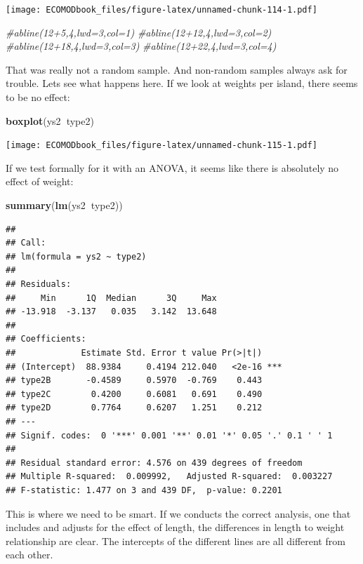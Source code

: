 \documentclass[
]{book}
\newenvironment{Shaded}{\begin{snugshade}}{\end{snugshade}}
\newcommand{\CommentTok}[1]{\textcolor[rgb]{0.56,0.35,0.01}{\textit{#1}}}
\newcommand{\KeywordTok}[1]{\textcolor[rgb]{0.13,0.29,0.53}{\textbf{#1}}}
\newcommand{\NormalTok}[1]{#1}
\newcommand{\OperatorTok}[1]{\textcolor[rgb]{0.81,0.36,0.00}{\textbf{#1}}}
\begin{document}
\texttt{[image: ECOMODbook\_files/figure-latex/unnamed-chunk-114-1.pdf]}

\begin{Shaded}
\begin{Highlighting}[]
\CommentTok{#abline(12+5,4,lwd=3,col=1)}
\CommentTok{#abline(12+12,4,lwd=3,col=2)}
\CommentTok{#abline(12+18,4,lwd=3,col=3)}
\CommentTok{#abline(12+22,4,lwd=3,col=4)}
\end{Highlighting}
\end{Shaded}

That was really not a random sample. And non-random samples always ask for trouble. Lets see what happens here. If we look at weights per island, there seems to be no effect:

\begin{Shaded}
\begin{Highlighting}[]
\KeywordTok{boxplot}\NormalTok{(ys2}\OperatorTok{~}\NormalTok{type2)}
\end{Highlighting}
\end{Shaded}

\texttt{[image: ECOMODbook\_files/figure-latex/unnamed-chunk-115-1.pdf]}

If we test formally for it with an ANOVA, it seems like there is absolutely no effect of weight:

\begin{Shaded}
\begin{Highlighting}[]
\KeywordTok{summary}\NormalTok{(}\KeywordTok{lm}\NormalTok{(ys2}\OperatorTok{~}\NormalTok{type2))}
\end{Highlighting}
\end{Shaded}

\begin{verbatim}
## 
## Call:
## lm(formula = ys2 ~ type2)
## 
## Residuals:
##     Min      1Q  Median      3Q     Max 
## -13.918  -3.137   0.035   3.142  13.648 
## 
## Coefficients:
##             Estimate Std. Error t value Pr(>|t|)    
## (Intercept)  88.9384     0.4194 212.040   <2e-16 ***
## type2B       -0.4589     0.5970  -0.769    0.443    
## type2C        0.4200     0.6081   0.691    0.490    
## type2D        0.7764     0.6207   1.251    0.212    
## ---
## Signif. codes:  0 '***' 0.001 '**' 0.01 '*' 0.05 '.' 0.1 ' ' 1
## 
## Residual standard error: 4.576 on 439 degrees of freedom
## Multiple R-squared:  0.009992,	Adjusted R-squared:  0.003227 
## F-statistic: 1.477 on 3 and 439 DF,  p-value: 0.2201
\end{verbatim}

This is where we need to be smart. If we conducts the correct analysis, one that includes and adjusts for the effect of length, the differences in length to weight relationship are clear. The intercepts of the different lines are all different from each other.
\end{document}
